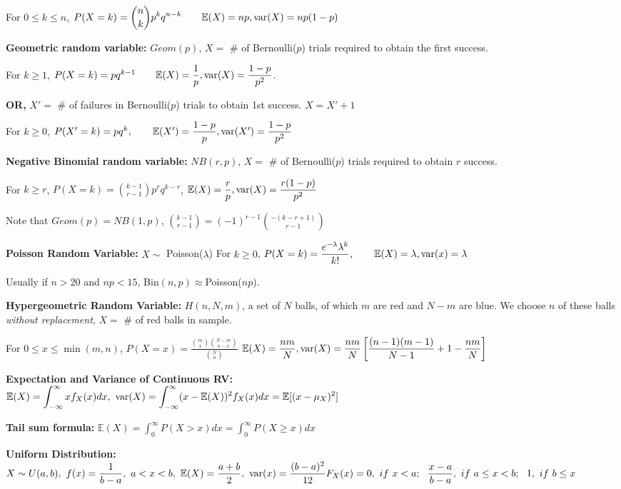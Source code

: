 \documentclass[10pt, a4paper]{article}
\newcommand{\E}{{\mathbb{E}}}
\newcommand{\var}{{\rm var}}
\newcommand{\disp}{\displaystyle}
\begin{document}
\begin{spacing}{1}
    For $0\le k\le n$, $\disp P(X=k)={n\choose k} p^k q^{n-k}
    \qquad \E(X)=np, \var(X)=np(1-p)$

    {\bf Geometric random variable:} $Geom(p)$, $X=$ \# of Bernoulli($p$)
    trials required to obtain the first success.

    For $k\ge 1$, $P(X=k)=pq^{k-1}\qquad \E(X)=\dfrac{1}{p}, \var(X)=\dfrac{1-p}{p^2}$.

    {\bf OR, }$X'=$ \# of failures in Bernoulli($p$) trials to obtain 1st success.
    $X=X'+1$

    For $k\ge 0$, $P(X'=k)=pq^k,\qquad \E(X')=\dfrac{1-p}{p}, \var(X')=\dfrac{1-p}{p^2}$

    {\bf Negative Binomial random variable:} $NB(r,p)$, $X=$ \# of Bernoulli($p$) trials
    required to obtain $r$ success.

    For $k\ge r$, $\disp P(X=k)={k-1\choose r-1}p^r q^{k-r}$,
    \qquad $\E(X)=\dfrac{r}{p}, \var(X)=\dfrac{r(1-p)}{p^2}$

    Note that $Geom(p)=NB(1,p)$, $\disp {k-1\choose r-1}=(-1)^{r-1}{-(k-r+1)\choose r-1}$

    {\bf Poisson Random Variable:} $X\sim$ Poisson($\lambda$) 
    \qquad For $k\ge 0$, $\disp P(X=k)=\frac{e^{-\lambda}\lambda^k}{k!},\qquad \E(X)=\lambda, 
    \var(x)=\lambda$

    Usually if $n>20$ and $np<15$, Bin$(n,p)\approx $Poisson($np$).

    {\bf Hypergeometric Random Variable:} $H(n,N,m)$, a set of $N$ balls, 
    of which $m$ are red and $N-m$ are blue. We choose $n$ of these balls 
    {\it without replacement}, $X=$ \# of red balls in sample.

    For $0\le x\le \min(m,n)$, $\disp P(X=x)=\frac{{m\choose x}{N-m\choose n-x}}{{N\choose n}}$
    \qquad $\disp \E(X)=\dfrac{nm}{N}, \var(X)=\frac{nm}{N}
    \left[\frac{(n-1)(m-1)}{N-1}+1-\frac{nm}{N}\right]$

    \newpage
    {\bf Expectation and Variance of Continuous RV:}\\
    $\disp \E(X)=\int_{-\infty}^{\infty} xf_X(x)dx,\ 
    \var (X)=\int_{-\infty}^{\infty} (x-\E(X))^2 f_X(x) dx=\E[(x-\mu_X)^2]$

    {\bf Tail sum formula:} 
    $\disp \E(X)=\int_0^{\infty}P(X>x) dx=\int_0^{\infty}P(X\ge x) dx$

    {\bf Uniform Distribution:}
    $\disp X\sim U(a,b),\ f(x)=\frac{1}{b-a},\ a< x< b,\ \E(X)=\frac{a+b}{2},\ 
    \var(x)=\frac{(b-a)^2}{12}\\
    F_X(x)=0,\ if\ x<a;\ \ \frac{x-a}{b-a},\ if\ a\le x<b;\ \ 1,\ if\ b\le x$



\end{spacing}
\end{document}
